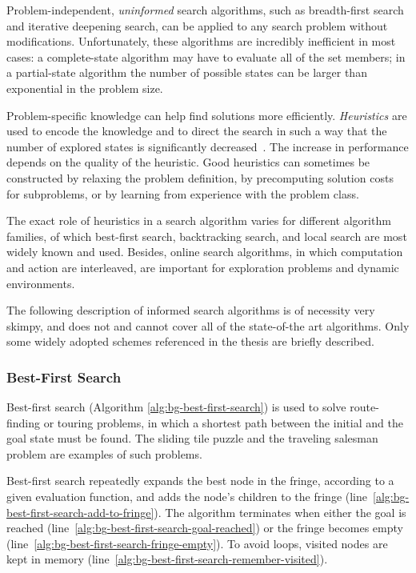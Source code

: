 Problem-independent, {\it uninformed} search algorithms, such as
breadth-first search and iterative deepening search, can be
applied to any search problem without modifications. Unfortunately,
these algorithms are incredibly inefficient in most cases: a
complete-state algorithm may have to evaluate all of the set members;
in a partial-state algorithm the number of possible states can be
larger than exponential in the problem size. 

Problem-specific knowledge can help find solutions more
efficiently. {\em Heuristics} are used to encode the knowledge and to
direct the search in such a way that the number of explored states is
significantly decreased~. The increase in
performance depends on the quality of the heuristic. Good heuristics
can sometimes be constructed by relaxing the problem definition, by
precomputing solution costs for subproblems, or by learning from
experience with the problem class. 

The exact role of heuristics in a search algorithm varies for
different algorithm families, of which best-first search, backtracking
search, and local search are most widely known and used. Besides, online
search algorithms, in which computation and action are interleaved,
are important for exploration problems and dynamic environments.

The following description of informed search algorithms is of
necessity very skimpy, and does not and cannot cover all of the
state-of-the art algorithms. Only some widely adopted schemes
referenced in the thesis are briefly described.
                             
\subsubsection{Best-First Search}
\label{sec:bg-best-first-search}

Best-first search (Algorithm \ref{alg:bg-best-first-search}) is used to
solve route-finding or touring problems, in which a shortest path
between the initial and the goal state must be found. The sliding tile
puzzle and the traveling salesman problem are examples of such
problems.

Best-first search repeatedly expands the best node in the fringe,
according to a given evaluation function, and adds the node's children
to the fringe (line~\ref{alg:bg-best-first-search-add-to-fringe}). The
algorithm terminates when either the goal is reached
(line~\ref{alg:bg-best-first-search-goal-reached}) or the fringe becomes
empty (line~\ref{alg:bg-best-first-search-fringe-empty}). To avoid
loops, visited nodes are kept in memory (line~\ref{alg:bg-best-first-search-remember-visited}).

